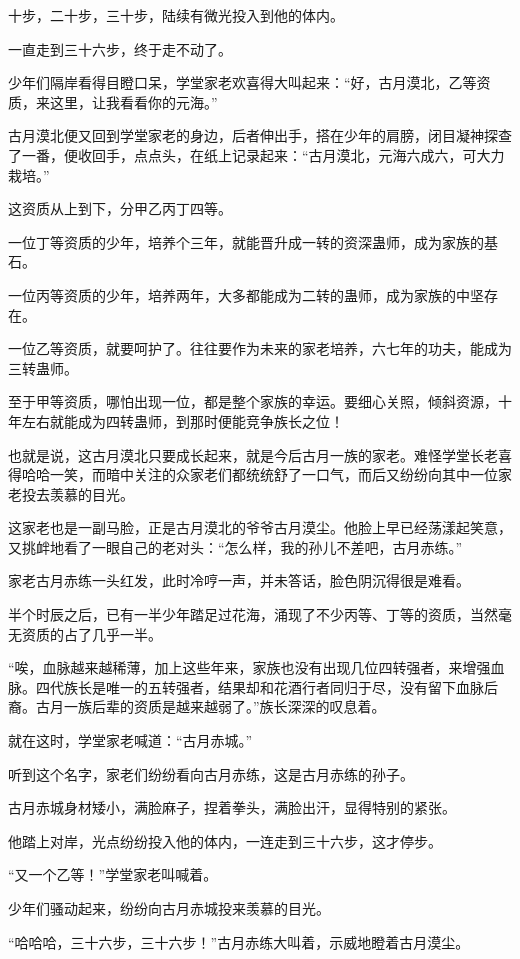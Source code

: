 \begin{this_body}
十步，二十步，三十步，陆续有微光投入到他的体内。

一直走到三十六步，终于走不动了。

少年们隔岸看得目瞪口呆，学堂家老欢喜得大叫起来：“好，古月漠北，乙等资质，来这里，让我看看你的元海。”

古月漠北便又回到学堂家老的身边，后者伸出手，搭在少年的肩膀，闭目凝神探查了一番，便收回手，点点头，在纸上记录起来：“古月漠北，元海六成六，可大力栽培。”

这资质从上到下，分甲乙丙丁四等。

一位丁等资质的少年，培养个三年，就能晋升成一转的资深蛊师，成为家族的基石。

一位丙等资质的少年，培养两年，大多都能成为二转的蛊师，成为家族的中坚存在。

一位乙等资质，就要呵护了。往往要作为未来的家老培养，六七年的功夫，能成为三转蛊师。

至于甲等资质，哪怕出现一位，都是整个家族的幸运。要细心关照，倾斜资源，十年左右就能成为四转蛊师，到那时便能竞争族长之位！

也就是说，这古月漠北只要成长起来，就是今后古月一族的家老。难怪学堂长老喜得哈哈一笑，而暗中关注的众家老们都统统舒了一口气，而后又纷纷向其中一位家老投去羡慕的目光。

这家老也是一副马脸，正是古月漠北的爷爷古月漠尘。他脸上早已经荡漾起笑意，又挑衅地看了一眼自己的老对头：“怎么样，我的孙儿不差吧，古月赤练。”

家老古月赤练一头红发，此时冷哼一声，并未答话，脸色阴沉得很是难看。

半个时辰之后，已有一半少年踏足过花海，涌现了不少丙等、丁等的资质，当然毫无资质的占了几乎一半。

“唉，血脉越来越稀薄，加上这些年来，家族也没有出现几位四转强者，来增强血脉。四代族长是唯一的五转强者，结果却和花酒行者同归于尽，没有留下血脉后裔。古月一族后辈的资质是越来越弱了。”族长深深的叹息着。

就在这时，学堂家老喊道：“古月赤城。”

听到这个名字，家老们纷纷看向古月赤练，这是古月赤练的孙子。

古月赤城身材矮小，满脸麻子，捏着拳头，满脸出汗，显得特别的紧张。

他踏上对岸，光点纷纷投入他的体内，一连走到三十六步，这才停步。

“又一个乙等！”学堂家老叫喊着。

少年们骚动起来，纷纷向古月赤城投来羡慕的目光。

“哈哈哈，三十六步，三十六步！”古月赤练大叫着，示威地瞪着古月漠尘。


\end{this_body}
